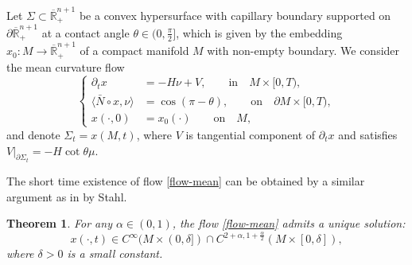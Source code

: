 \documentclass[11pt,reqno]{amsart}
\newtheorem{thm}{Theorem}[section]
\theoremstyle{definition}
\theoremstyle{remark}
\numberwithin{equation}{section}
\renewcommand{\(}{\left(}
\renewcommand{\)}{\right)}
\renewcommand{\-}{\overline}
\newcommand{\ra}{\rightarrow}
\begin{document}
Let $\Sigma\subset \-{\mathbb R}_{+}^{n+1}$ be a convex hypersurface with capillary boundary supported on $\partial\-{\mathbb R}_{+}^{n+1}$ at a contact angle $\theta\in (0,\frac{\pi}{2}]$, which is given by the embedding $x_0:M \ra \-{\mathbb R}_{+}^{n+1}$ of a compact manifold $M$ with non-empty boundary. We consider the mean curvature flow
	\begin{equation}\label{flow-mean}
		\left\{\begin{aligned}
			\partial_t x&=-H\nu+V, \qquad \text{in}\quad M \times[0,T),\\
			\langle\bar{N}\circ x,\nu\rangle&=\cos(\pi-\theta), \qquad \text{on}\quad \partial M \times[0,T),\\
			x(\cdot,0)&=x_0(\cdot) \qquad \text{on} \quad M,
		\end{aligned}\right.
	\end{equation}
and denote  $\Sigma_t=x(M,t)$, where $V$ is tangential component of $\partial_t x$ and satisfies $V\vert_{\partial\Sigma_t}=-H\cot\theta\mu$.

The short time existence of flow \eqref{flow-mean} can be obtained by a similar argument as in \cite{Stahl1996-2} by Stahl.
	\begin{thm}\label{short time}
		For any $\alpha\in(0,1)$, the flow \eqref{flow-mean} admits a unique solution:
		\begin{equation*}
			x(\cdot,t)\in C^{\infty}(M\times(0,\delta])\cap C^{2+\alpha,1+\frac{\alpha}{2}}(M\times[0,\delta]),
		\end{equation*}
		where $\delta>0$ is a small constant.
	\end{thm}
	
\end{document}
